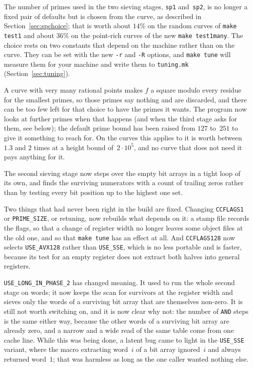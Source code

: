 \documentclass[12pt,a4paper,oneside]{amsart}
\begin{document}
The number of primes used in the two sieving stages, \texttt{sp1}
and~\texttt{sp2}, is no longer a fixed pair of defaults but is chosen from the
curve, as described in Section~\ref{sec:spchoice}; that is worth about $14\%$
on the random curves of \texttt{make test1} and about $36\%$ on the point-rich
curves of the new \texttt{make test1many}. The choice rests on two constants
that depend on the machine rather than on the curve. They can be set with the
new \verb+-r+ and \verb+-R+ options, and \texttt{make tune} will measure them
for your machine and write them to \texttt{tuning.mk}
(Section~\ref{sec:tuning}).

A curve with very many rational points makes $f$ a square modulo every residue
for the smallest primes, so those primes say nothing and are discarded, and
there can be too few left for that choice to have the primes it wants. The
program now looks at further primes when that happens (and when the third
stage asks for them, see below); the
default prime bound has been raised from $127$ to~$251$ to give it something to
reach for. On the curves this applies to it is worth between $1.3$ and $2$
times at a height bound of~$2\cdot10^5$, and no curve that does not need it
pays anything for it.

The second sieving stage now steps over the empty bit arrays in a tight loop of
its own, and finds the surviving numerators with a count of trailing zeros
rather than by testing every bit position up to the highest one set.

Two things that had never been right in the build are fixed. Changing
\texttt{CCFLAGS1} or \texttt{PRIME\_SIZE}, or retuning, now rebuilds what
depends on it: a stamp file records the flags, so that a change of register
width no longer leaves some object files at the old one, and so that
\texttt{make tune} has an effect at all. And \texttt{CCFLAGS128} now selects
\verb+USE_AVX128+ rather than \verb+USE_SSE+, which is no less portable and
is faster, because its test for an empty register does not extract both halves
into general registers.

\verb+USE_LONG_IN_PHASE_2+ has changed meaning. It used to run the whole
second stage on words; it now keeps the scan for survivors at the register
width and sieves only the words of a surviving bit array that are themselves
non-zero. It is still not worth switching on, and it is now clear why not:
the number of \texttt{AND} steps is the same either way, because the other
words of a surviving bit array are already zero, and a narrow and a wide read
of the same table come from one cache line. While this was being done, a
latent bug came to light in the \verb+USE_SSE+ variant, where the macro
extracting word~$i$ of a bit array ignored~$i$ and always returned word~$1$;
that was harmless as long as the one caller wanted nothing else.
\end{document}
